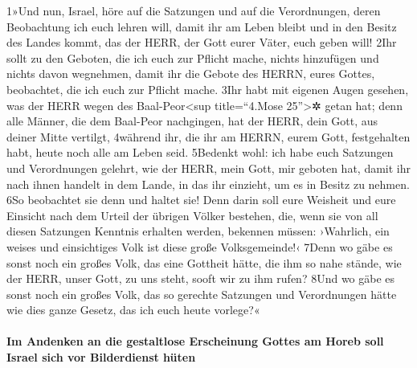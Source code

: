 1»Und nun, Israel, höre auf die Satzungen und auf die Verordnungen,
deren Beobachtung ich euch lehren will, damit ihr am Leben bleibt und in
den Besitz des Landes kommt, das der HERR, der Gott eurer Väter, euch
geben will! 2Ihr sollt zu den Geboten, die ich euch zur Pflicht mache,
nichts hinzufügen und nichts davon wegnehmen, damit ihr die Gebote des
HERRN, eures Gottes, beobachtet, die ich euch zur Pflicht mache. 3Ihr
habt mit eigenen Augen gesehen, was der HERR wegen des
Baal-Peor\textless sup title=``4.Mose 25''\textgreater✲ getan hat; denn
alle Männer, die dem Baal-Peor nachgingen, hat der HERR, dein Gott, aus
deiner Mitte vertilgt, 4während ihr, die ihr am HERRN, eurem Gott,
festgehalten habt, heute noch alle am Leben seid. 5Bedenkt wohl: ich
habe euch Satzungen und Verordnungen gelehrt, wie der HERR, mein Gott,
mir geboten hat, damit ihr nach ihnen handelt in dem Lande, in das ihr
einzieht, um es in Besitz zu nehmen. 6So beobachtet sie denn und haltet
sie! Denn darin soll eure Weisheit und eure Einsicht nach dem Urteil der
übrigen Völker bestehen, die, wenn sie von all diesen Satzungen Kenntnis
erhalten werden, bekennen müssen: ›Wahrlich, ein weises und einsichtiges
Volk ist diese große Volksgemeinde!‹ 7Denn wo gäbe es sonst noch ein
großes Volk, das eine Gottheit hätte, die ihm so nahe stände, wie der
HERR, unser Gott, zu uns steht, sooft wir zu ihm rufen? 8Und wo gäbe es
sonst noch ein großes Volk, das so gerechte Satzungen und Verordnungen
hätte wie dies ganze Gesetz, das ich euch heute vorlege?«

\hypertarget{im-andenken-an-die-gestaltlose-erscheinung-gottes-am-horeb-soll-israel-sich-vor-bilderdienst-huxfcten}{%
\paragraph{Im Andenken an die gestaltlose Erscheinung Gottes am Horeb
soll Israel sich vor Bilderdienst
hüten}\label{im-andenken-an-die-gestaltlose-erscheinung-gottes-am-horeb-soll-israel-sich-vor-bilderdienst-huxfcten}}

